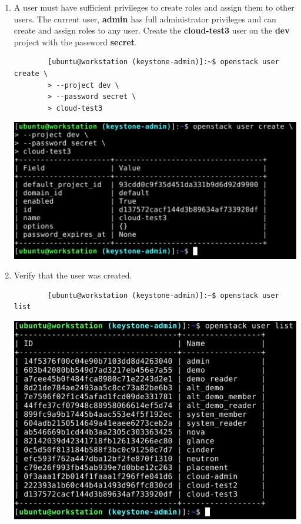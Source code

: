 \documentclass[letterpaper, 12pt]{article}
\begin{document}
\begin{enumerate}
    \item A user must have sufficient privileges to create roles and assign them to other users.
    The current user, \textbf{admin} has full administrator privileges and can create and assign roles to any user.
    Create the \textbf{cloud-test3} user on the \textbf{dev} project with the password \textbf{secret}.
    \begin{lstlisting}
        [ubuntu@workstation (keystone-admin)]:~$ openstack user create \
        > --project dev \
        > --password secret \
        > cloud-test3
    \end{lstlisting}

    \begin{center}
        \includegraphics[width=\linewidth]{images/part4/step6.png}
    \end{center}

    \item Verify that the user was created.
    \begin{lstlisting}
        [ubuntu@workstation (keystone-admin)]:~$ openstack user list
    \end{lstlisting}

    \begin{center}
        \includegraphics[width=\linewidth]{images/part4/step7.png}
    \end{center}


\end{enumerate}
\end{document}

